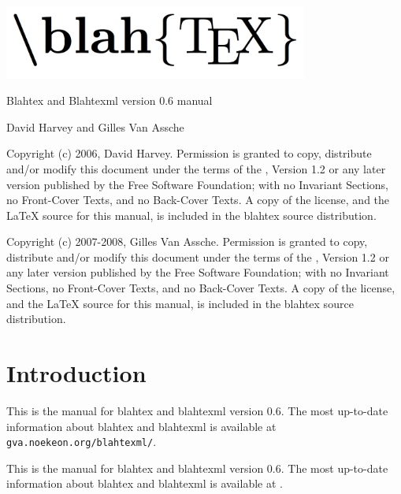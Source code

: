 \documentclass{article}
\newcommand{\blahtexversion}{0.6}
\begin{document}
\thispagestyle{empty}

\begin{center}
\includegraphics[width=10cm]{logo.png}

\vskip 1.6cm

{\Large Blahtex and Blahtexml version \blahtexversion{} manual}

\vskip 0.8cm

{\Large David Harvey} and {\Large Gilles Van Assche}
\end{center}

\vskip 1.6cm

{\footnotesize
Copyright (c) 2006, David Harvey. Permission is granted to copy, distribute
and/or modify this document under the terms of the
,
Version 1.2 or any later version published by the Free Software Foundation;
with no Invariant Sections, no Front-Cover Texts, and no Back-Cover Texts.
A copy of the license, and the \LaTeX{} source for this manual, is included
in the blahtex source distribution.
}

{\footnotesize
Copyright (c) 2007-2008, Gilles Van Assche. Permission is granted to copy, distribute and/or modify this document under the terms of the
,
Version 1.2 or any later version published by the Free Software Foundation;
with no Invariant Sections, no Front-Cover Texts, and no Back-Cover Texts.
A copy of the license, and the \LaTeX{} source for this manual, is included
in the blahtex source distribution.
}

\section{Introduction}

\begin{latexonly}
This is the manual for blahtex and blahtexml version \blahtexversion. The most up-to-date information about blahtex and blahtexml is available at \texttt{gva.noekeon.org/blahtexml/}.
\end{latexonly}

\begin{htmlonly}
This is the manual for blahtex and blahtexml version \blahtexversion. The most up-to-date information about blahtex and blahtexml is available at .
\end{htmlonly}
\end{document}
